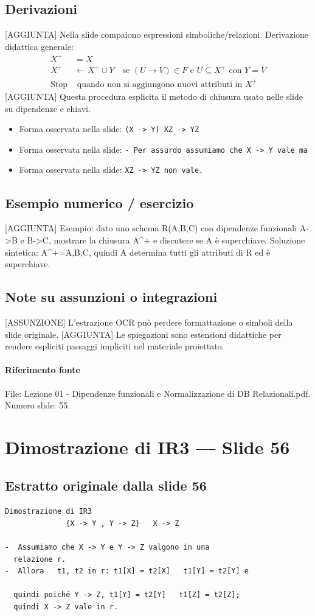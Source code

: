 \documentclass[11pt]{article}
\begin{document}
\subsection*{Derivazioni}
[AGGIUNTA] Nella slide compaiono espressioni simboliche/relazioni. Derivazione didattica generale:
\begin{align*}
X^+ &= X \\
X^+ &\leftarrow X^+ \cup Y \quad \text{se } (U \to V) \in F \text{ e } U \subseteq X^+ \text{ con } Y=V \\
\text{Stop} &\text{ quando non si aggiungono nuovi attributi in } X^+
\end{align*}
[AGGIUNTA] Questa procedura esplicita il metodo di chiusura usato nelle slide su dipendenze e chiavi.
\begin{itemize}[leftmargin=*]
\item Forma osservata nella slide: \texttt{(X -> Y)   XZ -> YZ}
\item Forma osservata nella slide: \texttt{-  Per assurdo assumiamo che X -> Y vale ma}
\item Forma osservata nella slide: \texttt{XZ -> YZ non vale.}
\end{itemize}
\subsection*{Esempio numerico / esercizio}
[AGGIUNTA] Esempio: dato uno schema R(A,B,C) con dipendenze funzionali A->B e B->C, mostrare la chiusura A^+ e discutere se A è superchiave. Soluzione sintetica: A^+={A,B,C}, quindi A determina tutti gli attributi di R ed è superchiave.
\subsection*{Note su assunzioni o integrazioni}
[ASSUNZIONE] L'estrazione OCR può perdere formattazione o simboli della slide originale.
[AGGIUNTA] Le spiegazioni sono estensioni didattiche per rendere espliciti passaggi impliciti nel materiale proiettato.
\paragraph{Riferimento fonte} File: Lezione 01 - Dipendenze funzionali e Normalizzazione di DB Relazionali.pdf. Numero slide: 55.
\section{Dimostrazione di IR3 --- Slide 56}
\subsection*{Estratto originale dalla slide 56}
\begin{lstlisting}
Dimostrazione di IR3
              {X -> Y , Y -> Z}   X -> Z

-  Assumiamo che X -> Y e Y -> Z valgono in una
  relazione r.
-  Allora   t1, t2 in r: t1[X] = t2[X]   t1[Y] = t2[Y] e

  quindi poiché Y -> Z, t1[Y] = t2[Y]   t1[Z] = t2[Z];
  quindi X -> Z vale in r.
\end{lstlisting}
\end{document}
